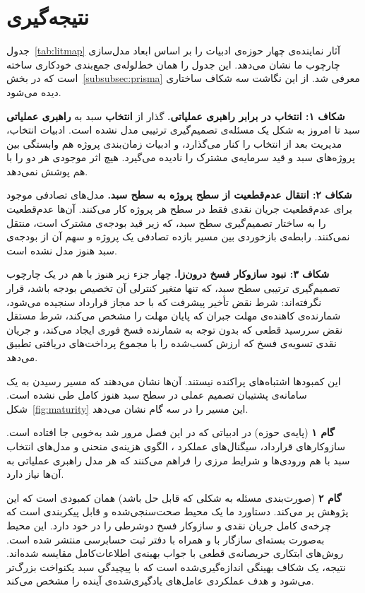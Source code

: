 \section{نتیجه‌گیری}
\label{subsec:lr_synthesis}

جدول~\ref{tab:litmap} آثار نماینده‌ی چهار حوزه‌ی ادبیات را بر اساس
ابعاد مدل‌سازی چارچوب ما نشان می‌دهد. این جدول را همان خط‌لوله‌ی
جمع‌بندی خودکاری ساخته است که در بخش~\ref{subsubsec:prisma} معرفی
شد. از این نگاشت سه شکاف ساختاری دیده می‌شود.

\textbf{شکاف ۱: انتخاب در برابر راهبری عملیاتی.}\;
گذار از \textbf{انتخاب} سبد به \textbf{راهبری عملیاتی} سبد تا امروز به
شکل یک مسئله‌ی تصمیم‌گیری ترتیبی مدل نشده است.
ادبیات انتخاب، مدیریت بعد از انتخاب را کنار می‌گذارد، و ادبیات
زمان‌بندی پروژه هم وابستگی بین پروژه‌های سبد و قید سرمایه‌ی مشترک را
نادیده می‌گیرد. هیچ اثر موجودی هر دو را با هم پوشش نمی‌دهد.

\textbf{شکاف ۲: انتقال عدم‌قطعیت از سطح پروژه به سطح سبد.}\;
مدل‌های تصادفی موجود برای عدم‌قطعیت جریان نقدی فقط در سطح هر پروژه
کار می‌کنند. آن‌ها عدم‌قطعیت را به ساختار تصمیم‌گیری سطح سبد، که زیر
قید بودجه‌ی مشترک است، منتقل نمی‌کنند.
رابطه‌ی بازخوردی بین مسیر بازده تصادفی یک پروژه و سهم آن از بودجه‌ی
سبد هنوز مدل نشده است.

\textbf{شکاف ۳: نبود سازوکار فسخ درون‌زا.}\;
چهار جزء زیر هنوز با هم در یک چارچوب تصمیم‌گیری ترتیبی سطح سبد، که
تنها متغیر کنترلی آن تخصیص بودجه باشد، قرار نگرفته‌اند:
شرط نقض تأخیر پیشرفت که با حد مجاز قرارداد سنجیده می‌شود، شمارنده‌ی
کاهنده‌ی مهلت جبران که پایان مهلت را مشخص می‌کند، شرط مستقل نقض
سررسید قطعی که بدون توجه به شمارنده فسخ فوری ایجاد می‌کند، و جریان
نقدی تسویه‌ی فسخ که ارزش کسب‌شده را با مجموع پرداخت‌های دریافتی
تطبیق می‌دهد.

\medskip
این کمبودها اشتباه‌های پراکنده نیستند. آن‌ها نشان می‌دهند که مسیر
رسیدن به یک سامانه‌ی پشتیبان تصمیم عملی در سطح سبد هنوز کامل طی
نشده است. شکل~\ref{fig:maturity} این مسیر را در سه گام نشان می‌دهد.

\textbf{گام ۱} (پایه‌ی حوزه) در ادبیاتی که در این فصل مرور شد به‌خوبی
جا افتاده است. سازوکارهای قرارداد، سیگنال‌های عملکرد ،
الگوی هزینه‌ی منحنی  و مدل‌های انتخاب سبد با هم ورودی‌ها و
شرایط مرزی را فراهم می‌کنند که هر مدل راهبری عملیاتی به آن‌ها نیاز
دارد.

\textbf{گام ۲} (صورت‌بندی مسئله به شکلی که قابل حل باشد) همان
کمبودی است که این پژوهش پر می‌کند.
دستاورد ما یک محیط  صحت‌سنجی‌شده و قابل پیکربندی است که
چرخه‌ی کامل جریان نقدی  و سازوکار فسخ دوشرطی را در خود
دارد. این محیط به‌صورت بسته‌ای سازگار با  و همراه با
دفتر ثبت حسابرسی  منتشر شده است.
روش‌های ابتکاری حریصانه‌ی قطعی با جواب بهینه‌ی اطلاعات‌کامل مقایسه
شده‌اند. نتیجه، یک شکاف بهینگی اندازه‌گیری‌شده است که با پیچیدگی
سبد یکنواخت بزرگ‌تر می‌شود و هدف عملکردی عامل‌های یادگیری‌شده‌ی آینده
را مشخص می‌کند.

